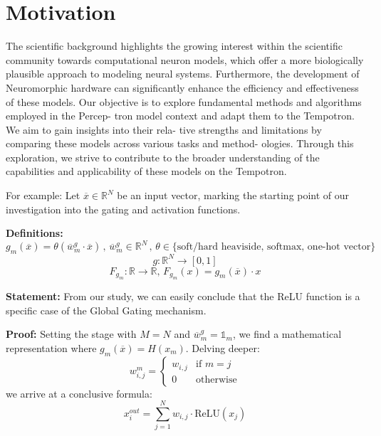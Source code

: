 \chapter{Motivation}
\label{chap:motivation}

The scientific background highlights the growing interest within the scientific community towards computational neuron models, which offer a more biologically plausible approach to modeling neural systems. Furthermore, the development of Neuromorphic hardware can significantly enhance the efficiency and effectiveness of these models.
Our objective is to explore fundamental methods and algorithms employed in the Percep-
tron model context and adapt them to the Tempotron. We aim to gain insights into their rela-
tive strengths and limitations by comparing these models across various tasks and method-
ologies. Through this exploration, we strive to contribute to the broader understanding of
the capabilities and applicability of these models on the Tempotron.

For example:
Let $\overline{x} \in \mathbb{R}^N$ be an input vector, marking the starting point of our investigation into the gating and activation functions. 

\textbf{Definitions:}
\begin{equation}
g_m(\overline{x}) = \theta(\overline{w}_m^g \cdot \overline{x}) \, , \, \overline{w}_m^g \in \mathbb{R}^N \, , \, \theta \in \{\text{soft/hard heaviside, softmax, one-hot vector}\}
\end{equation}
\begin{equation}
    g : \mathbb{R}^N \rightarrow [0, 1]
\end{equation}
\begin{equation}
F_{g_m} : \mathbb{R} \rightarrow \mathbb{R} , \, F_{g_m}(x) = g_m(\overline{x}) \cdot x
\end{equation}

\textbf{Statement:}
From our study, we can easily conclude that the ReLU function is a specific case of the Global Gating mechanism.

\textbf{Proof:}
Setting the stage with $M=N$ and $\overline{w}_m^g = \mathbb{1}_m$, we find a mathematical representation where $g_m(\overline{x}) = H(x_m)$. Delving deeper:
\begin{equation}
w_{i, j}^m = 
\begin{cases}
    w_{i, j} & \text{if } m = j \\
    0 & \text{otherwise}
\end{cases}
\end{equation}
we arrive at a conclusive formula:
\begin{equation}
x_i^{out} = \sum_{j=1}^N w_{i, j} \cdot \text{ReLU}(x_j)
\end{equation}
